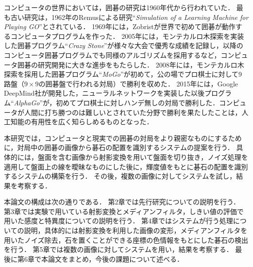 \documentclass[openright]{nitocs}
\numberwithin{equation}{section}
\begin{document}
        コンピュータの世界においては，囲碁の研究は1960年代から行われていた．
        最も古い研究は，1962年のRemusによる研究``{\it Simulation of a Learning Machine for Playing GO}''\cite{Remus}とされている．
        1969年には，Zobristが世界で初めて囲碁が動作するコンピュータプログラムを作った\cite{Zobrist}．
        2005年には，モンテカルロ木探索を実装した囲碁プログラム``{\it Crazy Stone}''\cite{CrazyStone}が様々な大会で優秀な成績を記録し，以降のコンピュータ囲碁プログラムでも同様のアルゴリズムを採用するなど，コンピュータ囲碁の研究開発に大きな進歩をもたらした．
        2008年には，モンテカルロ木探索を採用した囲碁プログラム``{\it MoGo}''が初めて，公の場でプロ棋士に対して9路盤（$9\times9$の囲碁盤で行われる対局）で勝利を収めた\cite{mogo}．
        2015年には，Google DeepMind社が開発した，ニューラルネットワークを実装した以後プログラム``{\it AlphaGo}''が，初めてプロ棋士に対しハンデ無しの対局で勝利した．コンピュータが人間に打ち勝つのは難しいとされていた分野で勝利を果たしたことは，人工知能の有用性を広く知らしめるものとなった．

        本研究では，コンピュータと現実での囲碁の対局をより親密なものにするために，対局中の囲碁の画像から碁石の配置を識別するシステムの提案を行う．
        具体的には，盤面を含む画像から射影変換を用いて盤面を切り抜き，ノイズ処理を適用して盤面上の線を曖昧なものにした後に，輝度値をもとに碁石の配置を識別するシステムの構築を行う．
        その後，複数の画像に対してシステムを試し，結果を考察する．

        本論文の構成は次の通りである．
        第2章では先行研究についての説明を行う．
        第3章では実験で用いている射影変換とメディアンフィルタ，しきい値の評価で用いた感度と特異度についての説明を行う．
        第4章ではシステムが行う処理についての説明，具体的には射影変換を利用した画像の変形，メディアンフィルタを用いたノイズ除去，石を置くことができる座標の色情報をもとにした碁石の検出を行う．
        第5章では複数の画像に対してシステムを用い，結果を考察する．
        最後に第6章で本論文をまとめ，今後の課題について述べる．
\end{document}
